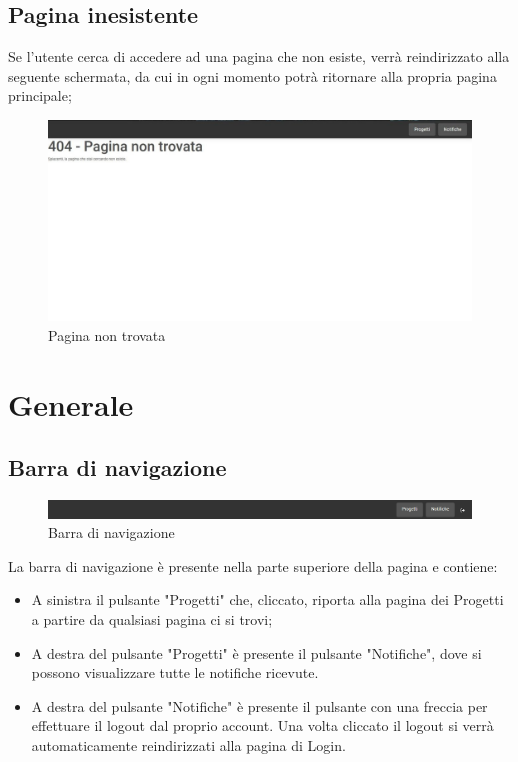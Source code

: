 \documentclass{article}
\begin{document}
\subsection{Pagina inesistente}
Se l’utente cerca di accedere ad una pagina che non esiste, verrà reindirizzato alla seguente schermata, da cui in ogni momento potrà ritornare alla propria pagina principale;
\begin{figure}[H]
      \centering
      \includegraphics[width=\textwidth]{documenti/Screenshot manuale utente/pagina non trovata.jpeg}
      \caption{Pagina non trovata}
      \label{err404}
    \end{figure}
   
\section{Generale}
\subsection{Barra di navigazione}
 \begin{figure}[H]
      \centering
      \includegraphics[width=\textwidth]{documenti/Screenshot manuale utente/navbar.png}
      \caption{Barra di navigazione}
      \label{navbar}
    \end{figure} 
La barra di navigazione è presente nella parte superiore della pagina e contiene: 
\begin{itemize}
    \item A sinistra il pulsante "Progetti" che, cliccato, riporta alla pagina dei Progetti a partire da qualsiasi pagina ci si trovi;
    \item A destra del pulsante "Progetti" è presente il pulsante "Notifiche", dove si possono visualizzare tutte le notifiche ricevute.
    \item A destra del pulsante "Notifiche" è presente il pulsante con una freccia per effettuare il logout dal proprio account. Una volta cliccato il logout si verrà automaticamente reindirizzati alla pagina di Login.
\end{itemize}
\end{document}
